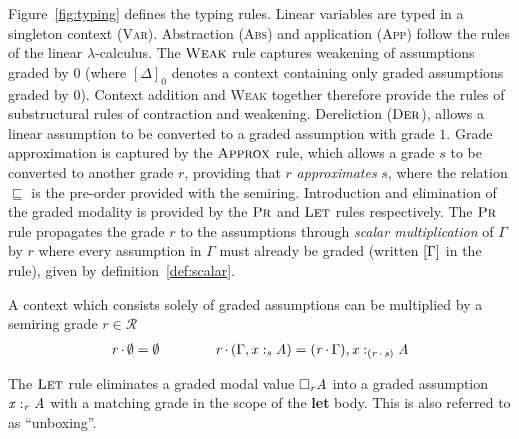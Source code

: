 Figure~\ref{fig:typing} defines the typing rules.
Linear variables are typed in a singleton context
(\textsc{Var}). Abstraction (\textsc{Abs}) and application (\textsc{App})
follow the rules of the linear $\lambda$-calculus.
The $\textsc{Weak}$ rule captures
weakening of assumptions graded by $0$ (where $[  \Delta  ]_{  0  }$ denotes a context
containing only graded assumptions graded by $0$). Context addition and
\textsc{Weak} together therefore provide the rules of substructural rules of contraction
and weakening.
Dereliction ($\textsc{Der}$),
allows a linear assumption to be converted to a graded assumption with grade
$1$. Grade approximation is captured by the $\textsc{Approx}$
rule, which allows a grade $s$ to be converted to another grade $r$,
providing that $r$ \textit{approximates} $s$, where the relation
$\sqsubseteq$ is the pre-order provided
with the semiring.
Introduction and elimination of the graded modality is provided by the
$\textsc{Pr}$ and $\textsc{Let}$ rules
respectively. The $\textsc{Pr}$ rule propagates the grade $r$ to the
assumptions through \emph{scalar multiplication} of $\Gamma$ by $r$ where
every assumption in $\Gamma$ must already be graded (written $[  \Gamma  ]$ in the rule), given by definition~\eqref{def:scalar}.
%
%
\begin{definition}
  \label{def:scalar}
 A context which consists solely of graded assumptions can be multiplied by a
 semiring grade $r \in \mathcal{R}$
\begin{align*}
   \textcolor{coeffectColor}{ \GRANULEnt{r}   \textcolor{coeffectColor}{\,\cdot\,} }   \emptyset = \emptyset
    \qquad\qquad
    \textcolor{coeffectColor}{ \GRANULEnt{r}   \textcolor{coeffectColor}{\,\cdot\,} }  \GRANULEsym{(}  \Gamma  \GRANULEsym{,}   \GRANULEmv{x}  :_{\textcolor{coeffectColor}{  \GRANULEnt{s}  } }   \GRANULEnt{A}   \GRANULEsym{)} = \GRANULEsym{(}   \textcolor{coeffectColor}{ \GRANULEnt{r}   \textcolor{coeffectColor}{\,\cdot\,} }  \Gamma   \GRANULEsym{)}  \GRANULEsym{,}   \GRANULEmv{x}  :_{\textcolor{coeffectColor}{  \GRANULEsym{(}  \GRANULEnt{r}  \textcolor{coeffectColor}{\,\cdot\,}  \GRANULEnt{s}  \GRANULEsym{)}  } }   \GRANULEnt{A}
\end{align*}
\end{definition}

The $\textsc{Let}$ rule eliminates a graded modal value $\Box_{  \mathit{r}  }  \mathit{A}$
into a graded assumption $\GRANULEmv{x}  :_{\textcolor{coeffectColor}{  \GRANULEnt{r}  } }   \GRANULEnt{A}$ with a matching
grade in the scope of the \textbf{let} body. This is also referred to as
``unboxing''.


